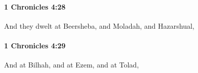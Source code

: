 		\paragraph{1 Chronicles 4:28} %
			\label{1CHRONICLES-4-28}

			And they dwelt at Beersheba, and Moladah, and Hazarshual,


		\paragraph{1 Chronicles 4:29} %
			\label{1CHRONICLES-4-29}

			And at Bilhah, and at Ezem, and at Tolad,


